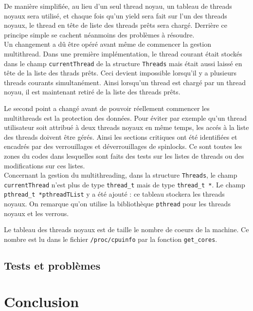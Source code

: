 \documentclass[a4paper,11pt]{article}
\begin{document}
De manière simplifiée, au lieu d'un seul thread noyau, un tableau de threads noyaux sera utilisé, et chaque fois qu'un yield sera fait sur l'un des threads noyaux, le thread en tête de liste des threads prêts sera chargé. Derrière ce principe simple se cachent néanmoins des problèmes à résoudre.\\

Un changement a dû être opéré avant même de commencer la gestion multithread. Dans une première implémentation, le thread courant était stockés dans le champ \texttt{currentThread} de la structure \texttt{Threads} mais était aussi laissé en tête de la liste des thrads prêts. Ceci devient impossible lorsqu'il y a plusieurs threads courants simultanément. Ainsi lorsqu'un thread est chargé par un thread noyau, il est maintenant retiré de la liste des threads prêts.

Le second point a changé avant de pouvoir réellement commencer les multithreads est la protection des données. Pour éviter par exemple qu'un thread utilisateur soit attribué à deux threads noyaux en même temps, les accés à la liste des threads doivent être gérés. Ainsi les sections critiques ont été identifiées et encadrés par des verrouillages et déverrouillages de spinlocks. Ce sont toutes les zones du codes dans lesquelles sont faits des tests sur les listes de threads ou des modifications sur ces listes.\\

Concernant la gestion du multithreading, dans la structure \texttt{Threads}, le champ \texttt{currentThread} n'est plus de type \texttt{thread\_t} mais de type \texttt{thread\_t *}. Le champ \texttt{pthread\_t *pthreadTList} y a été ajouté : ce tableau stockera les threads noyaux. On remarque qu'on utilise la bibliothèque \texttt{pthread} pour les threads noyaux et les verrous.

Le tableau des threads noyaux est de taille le nombre de coeurs de la machine. Ce nombre est lu dans le fichier \texttt{/proc/cpuinfo} par la fonction \texttt{get\_cores}.

\subsection{Tests et problèmes}


\section*{Conclusion} %
\end{document}
